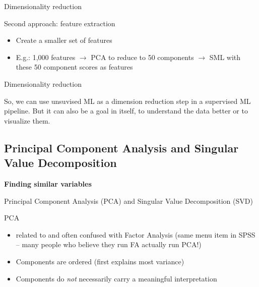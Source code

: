 \documentclass{beamer}
\begin{document}
\begin{frame}[fragile]{Dimensionality reduction}

\begin{block}{Second approach: feature extraction}
	\begin{itemize}
		\item Create a smaller set of features
		\item E.g.: 1,000 features $\rightarrow$ PCA to reduce to 50 components $\rightarrow$ SML with these 50 component scores as features
	\end{itemize}
\end{block}

\end{frame}



\begin{frame}[fragile]{Dimensionality reduction}

So, we can use unsuvised ML as a dimension reduction step in a supervised ML pipeline. 
\vspace{0.5cm}
But it can also be a goal in itself, to understand the data better or to visualize them.
\end{frame}







\subsection{Principal Component Analysis and Singular Value Decomposition}

\begin{frame}[plain]
\textbf{Finding similar variables}

Principal Component Analysis (PCA) and Singular Value Decomposition (SVD)
\end{frame}


\begin{frame}{PCA}
\begin{itemize}
	\item related to and often confused with Factor Analysis (same menu item in SPSS -- many people who believe they run FA actually run PCA!)
	\item Components are ordered (first explains most variance)
	\item Components do \emph{not} necessarily carry a meaningful interpretation
\end{itemize}
\end{frame}
\end{document}
